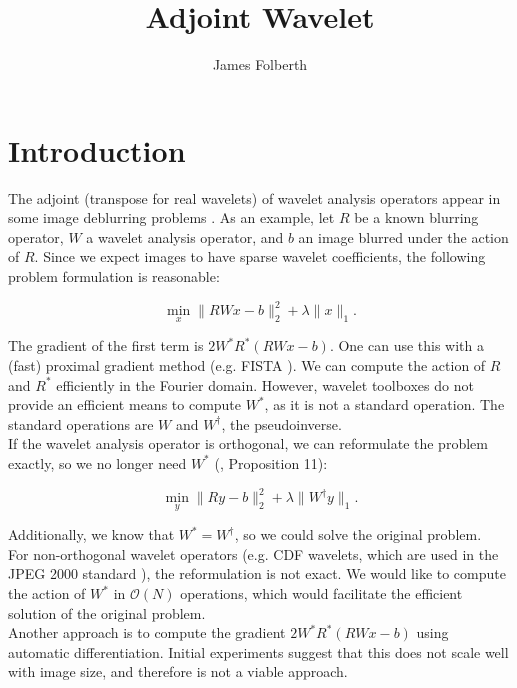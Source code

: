 \documentclass{article}
\title{Adjoint Wavelet}
\author{James Folberth}
\theoremstyle{mystuff}
\theoremstyle{myexample}
\theoremstyle{named}
\begin{document}
\maketitle
\tableofcontents

\section{Introduction}

The adjoint (transpose for real wavelets) of wavelet analysis operators appear in some image deblurring problems \cite{beck_2009}. As an example, let $R$ be a known blurring operator, $W$ a wavelet analysis operator, and $b$ an image blurred under the action of $R$. Since we expect images to have sparse wavelet coefficients, the following problem formulation is reasonable:

\[ \min_x \|RWx-b\|_2^2 + \lambda \|x\|_1. \] 

\noindent The gradient of the first term is $2W^*R^*(RWx-b)$. One can use this with a (fast) proximal gradient method (e.g. FISTA \cite{beck_2009}). We can compute the action of $R$ and $R^*$ efficiently in the Fourier domain. However, wavelet toolboxes do not provide an efficient means to compute $W^*$, as it is not a standard operation. The standard operations are $W$ and $W^\dagger$, the pseudoinverse.\\

If the wavelet analysis operator is orthogonal, we can reformulate the problem exactly, so we no longer need $W^*$ (\cite{combettes_2007}, Proposition 11):

\[ \min_y \|Ry-b\|_2^2 + \lambda \|W^\dagger y\|_1. \] 

\noindent Additionally, we know that $W^*=W^\dagger$, so we could solve the original problem.\\

For non-orthogonal wavelet operators (e.g. CDF wavelets, which are used in the JPEG 2000 standard \cite{skodras_2001}), the reformulation is not exact.  We would like to compute the action of $W^*$ in $\mathcal{O}(N)$ operations, which would facilitate the efficient solution of the original problem.\\

Another approach is to compute the gradient $2W^*R^*(RWx-b)$ using automatic differentiation.  Initial experiments suggest that this does not scale well with image size, and therefore is not a viable approach.\\
\end{document}
